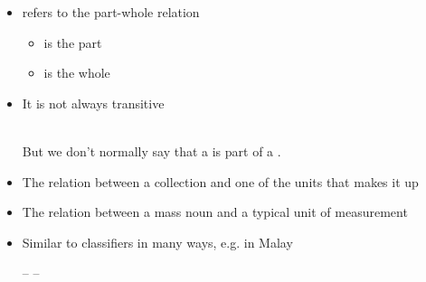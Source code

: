 \documentclass[a4paper,landscape,headrule,footrule,xetex]{foils}
\begin{document}

\begin{itemize}
\item {} refers to the part-whole relation
  \begin{itemize}
  \item {} is the part
  \item {} is the whole
  \end{itemize}
  \begin{tree}
  \end{tree}
\item It is not always transitive
  \begin{tree}
   \end{tree} \\
  But we don't normally say that a  is part of a .
\end{itemize}


\begin{itemize}
\item The relation between a collection and one of the units that makes it up
  \begin{exe}
    \ex {}
    \ex {}
    \ex {}
    \ex {}
    \ex {}
    \ex {}
    \ex {}
  \end{exe}
\end{itemize}


\begin{itemize}
\item The relation between a mass noun and a typical unit of measurement
  \begin{exe}
    \ex {}
    \ex {}
    \ex {}
    \ex {}
    \ex {}
    \ex {}
  \end{exe}
\item Similar to classifiers in many ways, e.g. in Malay
  \begin{exe}
    \ex {}--
    \ex {}--
  \end{exe}
\end{itemize}
\end{document}
